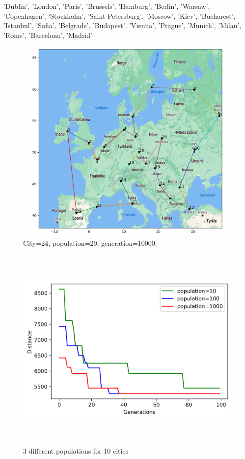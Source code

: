 \documentclass[a4paper,12pt]{article}
\begin{document}
'Dublin', 'London', 'Paris', 'Brussels', 'Hamburg', 'Berlin', 'Warsaw', 'Copenhagen', 'Stockholm', 'Saint Petersburg', 'Moscow', 'Kiev', 'Bucharest', 'Istanbul', 'Sofia', 'Belgrade', 'Budapest', 'Vienna', 'Prague', 'Munich', 'Milan', 'Rome', 'Barcelona', 'Madrid'

\begin{figure}[H]
\centerline{\includegraphics[width=6in, height=4in]{geneticMap7.png}}
\caption{City=24, population=20, generation=10000.}
\label{fig}
\end{figure}

\begin{figure}[H]
\centerline{\includegraphics[width=6in, height=4in]{genetic.png}}
\caption{3 different populations for 10 cities}
\label{fig}
\end{figure}
\end{document}
